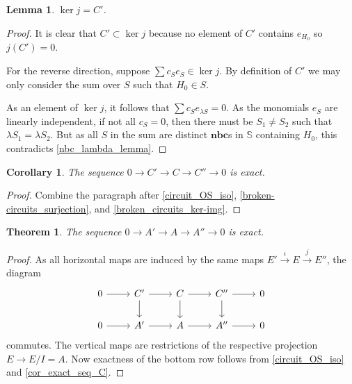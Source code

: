 \documentclass[article,twoside]{article}
\newcommand{\BB}[1]{\mathbb{#1}}
\newcommand{\tuples}{\BB{S}}
\newcommand{\NBC}{$\textbf{nbc}$}
\theoremstyle{plain}
\newtheorem{theorem}{Theorem}[section]
\theoremstyle{plain}
\newtheorem{lemma}[lemma]{Lemma}
\theoremstyle{plain}
\theoremstyle{plain}
\newtheorem{corollary}[corollary]{Corollary}
\theoremstyle{plain}
\theoremstyle{definition}
\theoremstyle{definition}
\theoremstyle{definition}
\theoremstyle{remark}
\theoremstyle{remark}
\begin{document}
\begin{lemma}\label{broken_circuits_ker-img}
	$\ker j = C'$.
\end{lemma}
\begin{proof}
	It is clear that $C'\subset \ker j$ because no element of $C'$ contains $e_{H_0}$ so $j(C')=0$.
	
	For the reverse direction, suppose $\sum c_Se_S\in\ker j$. By definition of $C'$ we may only consider the sum over $S$ such that $H_0\in S$.
	
	As an element of $\ker j$, it follows that $\sum c_S e_{\lambda S}=0$. As the monomials $e_S$ are linearly independent, if not all $c_S=0$, then there must be $S_1\neq S_2$ such that $\lambda S_1=\lambda S_2$. But as all $S$ in the sum are distinct \NBC s in $\tuples$ containing $H_0$, this contradicts \autoref{nbc_lambda_lemma}.
\end{proof}

\begin{corollary}\label{cor_exact_seq_C}
	The sequence $0\to C'\to C\to C''\to 0$ is exact.
\end{corollary}
\begin{proof}
	Combine the paragraph after \autoref{circuit_OS_iso}, \autoref{broken-circuits_surjection}, and \autoref{broken_circuits_ker-img}.
\end{proof}




\begin{theorem}\label{OS_exact}
	The sequence $0\to A'\to A\to A''\to 0$ is exact.
\end{theorem}
\begin{proof}
	As all horizontal maps are induced by the same maps $E'\overset{\iota}{\rightarrow}E\overset{j}{\rightarrow}E''$, the diagram
	\begin{equation*}
		\begin{tikzcd}
			0\rar&C'\dar\rar&C\dar\rar&C''\dar\rar&0
			\\
			0\rar&A'\rar&A\rar&A''\rar&0
		\end{tikzcd}
	\end{equation*}
	commutes. The vertical maps are restrictions of the respective projection $E\to E/I=A$. Now exactness of the bottom row follows from \autoref{circuit_OS_iso} and \autoref{cor_exact_seq_C}.
\end{proof}
\end{document}
